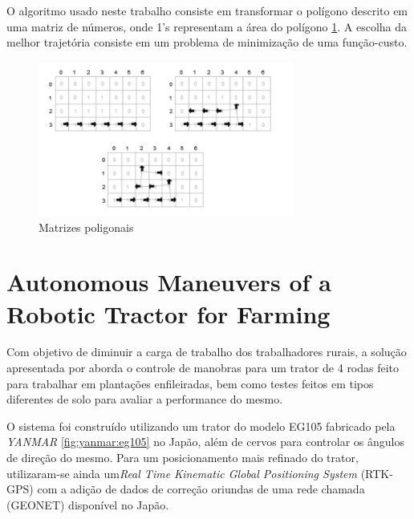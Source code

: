 O algoritmo usado neste trabalho consiste em transformar o polígono descrito em uma matriz de números, onde 1's representam a área do polígono \ref{fig:matriz:poligono}. A escolha da melhor trajetória consiste em um problema de minimização de uma função-custo.
\begin{figure}[H]
    \centering
    \includegraphics[width=0.75\textwidth]{figuras/matrizesPoligno.png}
    \caption{Matrizes poligonais}
    \label{fig:matriz:poligono}
\end{figure}
\section{Autonomous Maneuvers of a Robotic Tractor for
Farming}

Com objetivo de diminuir a carga de trabalho dos trabalhadores rurais, a solução apresentada por \cite{Wang2016} aborda o controle de manobras para um trator de 4 rodas feito para trabalhar em plantações enfileiradas, bem como testes feitos em tipos diferentes de solo para avaliar a performance do mesmo.

O sistema foi construído utilizando um trator do modelo EG105 fabricado pela \textit{YANMAR} \ref{fig:yanmar:eg105} no Japão, além de cervos para controlar os ângulos de direção do mesmo. Para um posicionamento mais refinado do trator, utilizaram-se ainda um\textit{Real Time Kinematic Global Positioning System} (RTK-GPS) com a adição de dados de correção oriundas de uma rede chamada (GEONET)  disponível no Japão. 

